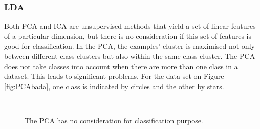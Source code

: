 \subsubsection{LDA}
Both PCA and ICA are unsupervised methods that yield a set of linear features of a particular dimension, but there is no consideration if this set of features is good for classification. In the PCA, the examples' cluster is maximised not only between different class clusters but also within the same class cluster. The PCA does not take classes into account when there are more than one class in a dataset. This leads to significant problems. For the data set on \mbox{Figure} \ref{fig:PCAbada}, one class is indicated by circles and the other by stars. 
\begin{figure}[ht]
 \begin{center}
  \\
 \end{center}
\caption{The PCA has no consideration for classification purpose. \cite{Forsyth2003}}
\label{fig:PCAbad}
\end{figure} 

